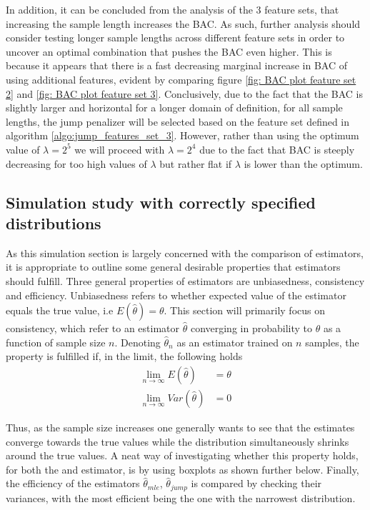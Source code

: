 In addition, it can be concluded from the analysis of the 3 feature sets, that increasing the sample length increases the BAC. As such, further analysis should consider testing longer sample lengths across different feature sets in order to uncover an optimal combination that pushes  the BAC even higher. This is because it appears that there is a fast decreasing marginal increase in BAC of using additional features, evident by comparing figure \ref{fig: BAC plot feature set 2} and \ref{fig: BAC plot feature set 3}. Conclusively, due to the fact that the BAC is slightly larger and horizontal for a longer domain of definition, for all sample lengths, the jump penalizer will be selected based on the feature set defined in algorithm \ref{algo:jump_features_set_3}. However, rather than using the optimum value of $\lambda=2^5$ we will proceed with $\lambda=2^4$ due to the fact that BAC is steeply decreasing for too high values of $\lambda$ but rather flat if $\lambda$ is lower than the optimum.

\subsection{Simulation study with correctly specified distributions}
\label{section:simulation_corspeciffied}
As this simulation section is largely concerned with the comparison of estimators, it is appropriate to outline some general desirable properties that estimators should fulfill. Three general properties of estimators are unbiasedness, consistency and efficiency. Unbiasedness refers to whether expected value of the estimator equals the true value, i.e $E(\hat\theta)=\theta$. This section will primarily focus on consistency, which refer to an estimator $\hat\theta$ converging in probability to $\theta$ as a function of sample size $n$. Denoting $\hat\theta_n$ as an estimator trained on $n$ samples, the property is fulfilled if, in the limit, the following holds
\begin{align}
    \lim_{n\to\infty} E(\hat\theta) &= \theta \\
    \lim_{n\to\infty} Var(\hat\theta) &= 0
\label{eq:sim_consistency}
\end{align}

Thus, as the sample size increases one generally wants to see that the estimates converge towards the true values while the distribution simultaneously shrinks around the true values. A neat way of investigating whether this property holds, for both the \mle and \jump estimator, is by using boxplots as shown further below. Finally, the efficiency of the estimators $\hat\theta_{mle}$, $\hat\theta_{jump}$ is compared by checking their variances, with the most efficient being the one with the narrowest distribution.

